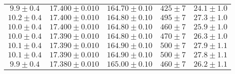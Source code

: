 \begin{table}
\begin{tabular}{c c c c c}
        $9.9\pm0.4$ & $17.400\pm0.010$ & $164.70\pm0.10$ & $425\pm7$ & $24.1\pm1.0$ \\
        $10.2\pm0.4$ & $17.400\pm0.010$ & $164.80\pm0.10$ & $495\pm7$ & $27.3\pm1.0$ \\
        $10.0\pm0.4$ & $17.400\pm0.010$ & $164.80\pm0.10$ & $460\pm7$ & $25.9\pm1.0$ \\
        $10.0\pm0.4$ & $17.390\pm0.010$ & $164.80\pm0.10$ & $470\pm7$ & $26.3\pm1.0$ \\
        $10.1\pm0.4$ & $17.390\pm0.010$ & $164.90\pm0.10$ & $500\pm7$ & $27.9\pm1.1$ \\
        $10.1\pm0.4$ & $17.390\pm0.010$ & $164.90\pm0.10$ & $500\pm7$ & $27.8\pm1.1$ \\
        $9.9\pm0.4$ & $17.380\pm0.010$ & $165.00\pm0.10$ & $460\pm7$ & $26.2\pm1.1$ \\
        \bottomrule
    \end{tabular}
\end{table}
\FloatBarrier

